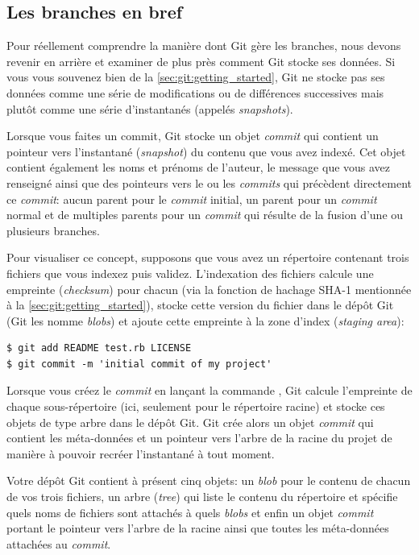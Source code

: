 \subsection{Les branches en bref}
\label{sec:git:branches_overview}

Pour réellement comprendre la manière dont Git gère les branches, nous devons revenir en arrière et examiner de plus près comment Git stocke ses données.
Si vous vous souvenez bien de la \autoref{sec:git:getting_started}, Git ne stocke pas ses données comme une série de modifications ou de différences successives mais plutôt comme une série d'instantanés (appelés \emph{snapshots}).

Lorsque vous faites un commit, Git stocke un objet \emph{commit} qui contient un pointeur vers l'instantané (\emph{snapshot}) du contenu que vous avez indexé.
Cet objet contient également les noms et prénoms de l'auteur, le message que vous avez renseigné ainsi que des pointeurs vers le ou les \emph{commits} qui précèdent directement ce \emph{commit}: aucun parent pour le \emph{commit} initial, un parent pour un \emph{commit} normal et de multiples parents pour un \emph{commit} qui résulte de la fusion d'une ou plusieurs branches.

Pour visualiser ce concept, supposons que vous avez un répertoire contenant trois fichiers que vous indexez puis validez.
L'indexation des fichiers calcule une empreinte (\emph{checksum}) pour chacun (via la fonction de hachage SHA-1 mentionnée à la \autoref{sec:git:getting_started}), stocke cette version du fichier dans le dépôt Git (Git les nomme \emph{blobs}) et ajoute cette empreinte à la zone d'index (\emph{staging area}):
\begin{Schunk}
\begin{Verbatim}
$ git add README test.rb LICENSE
$ git commit -m 'initial commit of my project'
\end{Verbatim}
\end{Schunk}

Lorsque vous créez le \emph{commit} en lançant la commande , Git calcule l'empreinte de chaque sous-répertoire (ici, seulement pour le répertoire racine) et stocke ces objets de type arbre dans le dépôt Git.
Git crée alors un objet \emph{commit} qui contient les méta-données et un pointeur vers l'arbre de la racine du projet de manière à pouvoir recréer l'instantané à tout moment.

Votre dépôt Git contient à présent cinq objets:
un \emph{blob} pour le contenu de chacun de vos trois fichiers, un arbre (\emph{tree}) qui liste le contenu du répertoire et spécifie quels noms de fichiers sont attachés à quels \emph{blobs} et enfin un objet \emph{commit} portant le pointeur vers l'arbre de la racine ainsi que toutes les méta-données attachées au \emph{commit}.


